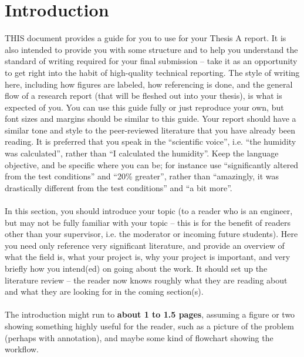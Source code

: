 \section{Introduction}

THIS document provides a guide for you to use for your Thesis A report. It is also intended to provide you with some structure and to help you understand the standard of writing required for your final submission – take it as an opportunity to get right into the habit of high-quality technical reporting. The style of writing here, including how figures are labeled, how referencing is done, and the general flow of a research report (that will be fleshed out into your thesis), is what is expected of you. You can use this guide fully or just reproduce your own, but font sizes and margins should be similar to this guide. Your report should have a similar tone and style to the peer-reviewed literature that you have already been reading. It is preferred that you speak in the “scientific voice”, i.e. “the humidity was calculated”, rather than “I calculated the humidity”. Keep the language objective, and be specific where you can be; for instance use “significantly altered from the test conditions” and “20\% greater”, rather than “amazingly, it was drastically different from the test conditions” and “a bit more”. %
	\\ %
	\\
In this section, you should introduce your topic (to a reader who is an engineer, but may not be fully familiar with your topic – this is for the benefit of readers other than your supervisor, i.e. the moderator or incoming future students). Here you need only reference very significant literature, and provide an overview of what the field is, what your project is, why your project is important, and very briefly how you intend(ed) on going about the work. It should set up the literature review – the reader now knows roughly what they are reading about and what they are looking for in the coming section(s). 
	\\
	\\ %
The introduction might run to \textbf{about 1 to 1.5 pages}, assuming a figure or two showing something highly useful for the reader, such as a picture of the problem (perhaps with annotation), and maybe some kind of flowchart showing the workflow. 
